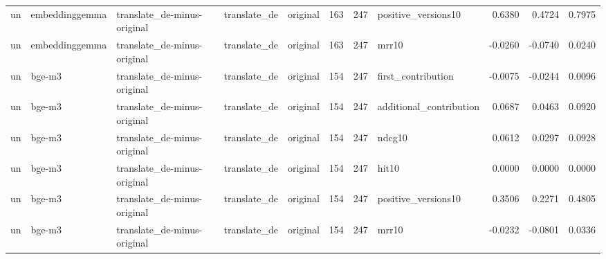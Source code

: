 \begin{tabular}{lllllrrlrrr}
un & embeddinggemma & translate\_de-minus-original & translate\_de & original & 163 & 247 & positive\_versions10 & 0.6380 & 0.4724 & 0.7975 \\
un & embeddinggemma & translate\_de-minus-original & translate\_de & original & 163 & 247 & mrr10 & -0.0260 & -0.0740 & 0.0240 \\
un & bge-m3 & translate\_de-minus-original & translate\_de & original & 154 & 247 & first\_contribution & -0.0075 & -0.0244 & 0.0096 \\
un & bge-m3 & translate\_de-minus-original & translate\_de & original & 154 & 247 & additional\_contribution & 0.0687 & 0.0463 & 0.0920 \\
un & bge-m3 & translate\_de-minus-original & translate\_de & original & 154 & 247 & ndcg10 & 0.0612 & 0.0297 & 0.0928 \\
un & bge-m3 & translate\_de-minus-original & translate\_de & original & 154 & 247 & hit10 & 0.0000 & 0.0000 & 0.0000 \\
un & bge-m3 & translate\_de-minus-original & translate\_de & original & 154 & 247 & positive\_versions10 & 0.3506 & 0.2271 & 0.4805 \\
un & bge-m3 & translate\_de-minus-original & translate\_de & original & 154 & 247 & mrr10 & -0.0232 & -0.0801 & 0.0336 \\
\bottomrule
\end{tabular}

